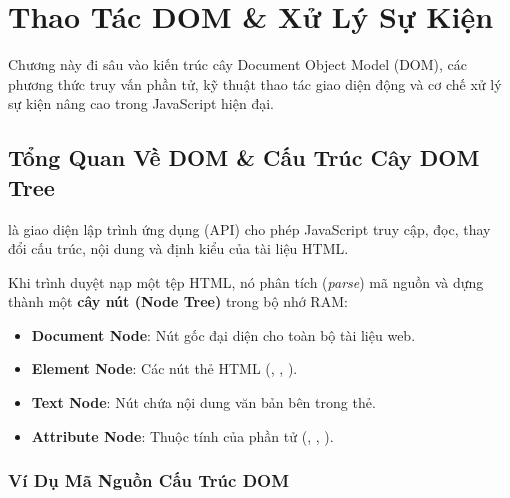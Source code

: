 \chapter{Thao Tác DOM \& Xử Lý Sự Kiện}
\label{chap:dom_events}

Chương này đi sâu vào kiến trúc cây Document Object Model (DOM), các phương thức truy vấn phần tử, kỹ thuật thao tác giao diện động và cơ chế xử lý sự kiện nâng cao trong JavaScript hiện đại.

\section{Tổng Quan Về DOM \& Cấu Trúc Cây DOM Tree}

 là giao diện lập trình ứng dụng (API) cho phép JavaScript truy cập, đọc, thay đổi cấu trúc, nội dung và định kiểu của tài liệu HTML.

\begin{conceptBox}
Khi trình duyệt nạp một tệp HTML, nó phân tích (\textit{parse}) mã nguồn và dựng thành một \textbf{cây nút (Node Tree)} trong bộ nhớ RAM:
\begin{itemize}
    \item \textbf{Document Node}: Nút gốc đại diện cho toàn bộ tài liệu web.
    \item \textbf{Element Node}: Các nút thẻ HTML (, , ).
    \item \textbf{Text Node}: Nút chứa nội dung văn bản bên trong thẻ.
    \item \textbf{Attribute Node}: Thuộc tính của phần tử (, , ).
\end{itemize}
\end{conceptBox}

\subsection{Ví Dụ Mã Nguồn Cấu Trúc DOM}

